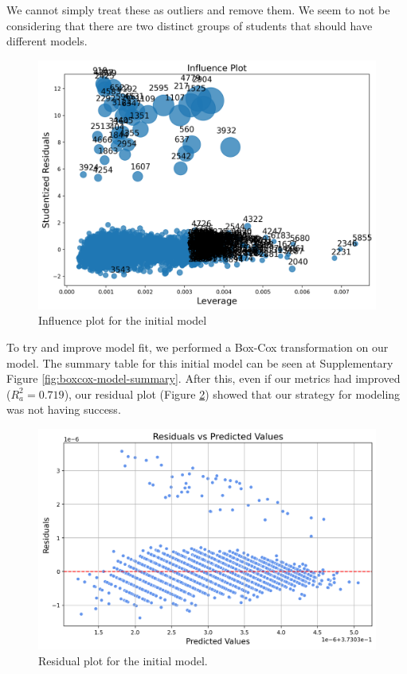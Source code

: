 \documentclass[twocolumn]{article} %
\begin{document}
We cannot simply treat these as outliers and remove them. We seem to not be considering that there are two distinct groups of students that should have different models.

\begin{figure}[h]
  \centering
  \includegraphics[width=\columnwidth]{6-influence-plot.png}
  \caption{Influence plot for the initial model}
  \label{6:influence-plot}
\end{figure}

To try and improve model fit, we performed a Box-Cox transformation on our model. The summary table for this initial model can be seen at Supplementary Figure \ref{fig:boxcox-model-summary}. After this, even if our metrics had improved ($R^2_a = 0.719$), our residual plot (Figure \ref{7:initial-residual}) showed that our strategy for modeling was not having success.

\begin{figure}[h]
  \centering
  \includegraphics[width=\columnwidth]{7-residual-plot.png}
  \caption{Residual plot for the initial model.}
  \label{7:initial-residual}
\end{figure}
\end{document}
